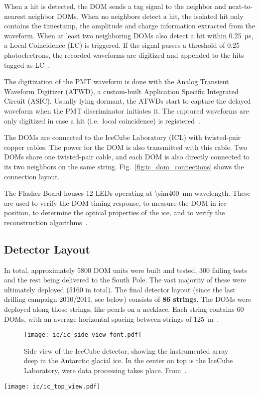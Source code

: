 When a hit is detected, the DOM sends a tag signal to the neighbor and next-to-nearest neighbor DOMs. When no neighbors detect a hit, the isolated hit only contains the timestamp, the amplitude and charge information extracted from the waveform. When at least two neighboring DOMs also detect a hit within \SI{0.25}{\micro\s}, a Local Coincidence (LC) is triggered. If the signal passes a threshold of 0.25 photoelectrons, the recorded waveforms are digitized and appended to the hits tagged as LC~\cite{Aartsen2017}.

The digitization of the PMT waveform is done with the Analog Transient Waveform Digitizer (ATWD), a custom-built Application Specific Integrated Circuit (ASIC). Usually lying dormant, the ATWDs start to capture the delayed waveform when the PMT discriminator initiates it. The captured waveforms are only digitized in case a hit (i.e.\ local coincidence) is registered~\cite{Aartsen2017}.

The DOMs are connected to the IceCube Laboratory (ICL) with twisted-pair copper cables. The power for the DOM is also transmitted with this cable. Two DOMs share one twisted-pair cable, and each DOM is also directly connected to its two neighbors on the same string. Fig.~\ref{fig:ic_dom_connections} shows the connection layout.

The Flasher Board houses 12 LEDs operating at \SI{\sim400}{\nm} wavelength. These are used to verify the DOM timing response, to measure the DOM in-ice position, to determine the optical properties of the ice, and to verify the reconstruction algorithms~\cite{Aartsen2017}.

\subsection{Detector Layout}
In total, approximately 5800 DOM units were built and tested, 300 failing tests and the rest being delivered to the South Pole. The vast majority of these were ultimately deployed (5160 in total). The final detector layout (since the last drilling campaign 2010/2011, see below) consists of \textbf{86 strings}. The DOMs were deployed along those strings, like pearls on a necklace. Each string contains 60 DOMs, with an average horizontal spacing between strings of \SI{125}{\meter}~\cite{Aartsen2017}.

\begin{figure}
    \texttt{[image: ic/ic\_side\_view\_font.pdf]}
    \caption[IceCube side-on]{Side view of the IceCube detector, showing the instrumented array deep in the Antarctic glacial ice. In the center on top is the IceCube Laboratory, were data processing takes place. From~\cite{Ahlers2018a}.}
\end{figure}
\begin{marginfigure}
    \texttt{[image: ic/ic\_top\_view.pdf]}
    \caption[IceCube top-down view]{Top-down view of the IceCube detector, spanning \SI{1}{\square\km} on the surface. From~\cite{Ahlers2018a}.}
\end{marginfigure}

